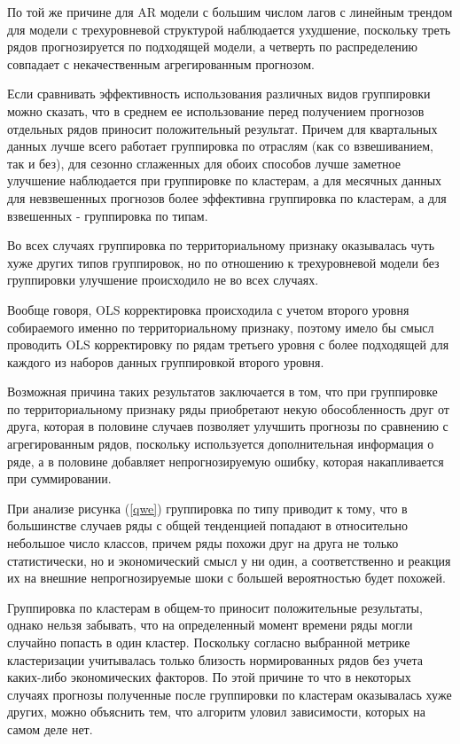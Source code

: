 \documentclass[12pt,a4paper, oneside]{extreport}
\begin{document}
По той же причине для AR модели с большим числом лагов с линейным трендом для модели с трехуровневой структурой наблюдается ухудшение, поскольку треть рядов прогнозируется по подходящей модели, а четверть по распределению  совпадает   с некачественным агрегированным прогнозом.  


Если сравнивать эффективность использования различных видов группировки можно сказать, что  в среднем ее использование  перед получением прогнозов отдельных рядов приносит положительный результат. Причем для квартальных данных лучше всего работает группировка по отраслям (как со взвешиванием, так и без), для сезонно сглаженных для обоих способов лучше заметное улучшение наблюдается при группировке по кластерам, а для месячных данных для невзвешенных прогнозов более эффективна группировка по кластерам, а для взвешенных - группировка по типам.


Во всех случаях группировка по территориальному признаку оказывалась чуть хуже других типов группировок, но по отношению к трехуровневой модели без группировки улучшение происходило не во всех случаях.  

Вообще говоря, OLS корректировка происходила с учетом второго уровня собираемого именно по территориальному признаку, поэтому имело бы смысл проводить OLS корректировку по  рядам третьего уровня с более подходящей  для каждого из наборов данных группировкой второго уровня. 


Возможная причина таких результатов заключается в том, что при группировке по территориальному признаку ряды приобретают 
некую обособленность друг от друга, которая в половине случаев позволяет улучшить прогнозы по сравнению с агрегированным рядов, поскольку используется дополнительная информация о ряде, а в половине добавляет непрогнозируемую ошибку, которая накапливается при суммировании. 

При анализе рисунка (\ref{qwe}) группировка по типу приводит к тому, что в большинстве случаев ряды с общей тенденцией попадают в относительно небольшое число классов, причем ряды похожи друг на друга не только статистически, но и экономический смысл у ни один, а соответственно и реакция их на внешние непрогнозируемые шоки с большей вероятностью будет похожей. 

Группировка по кластерам в общем-то приносит положительные результаты, однако нельзя забывать, что на определенный момент времени ряды могли случайно попасть в один кластер. Поскольку согласно выбранной метрике кластеризации учитывалась только близость нормированных рядов без учета каких-либо экономических факторов. По этой причине то что  в некоторых случаях  прогнозы полученные после группировки по кластерам оказывалась хуже других, можно объяснить  тем, что  алгоритм  уловил зависимости, которых на самом деле нет.  
\end{document}

